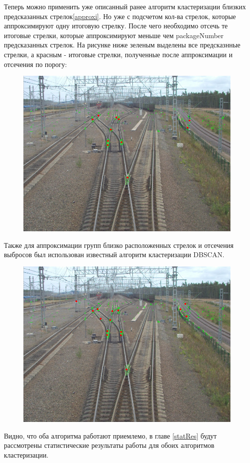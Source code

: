 Теперь можно применить уже описанный ранее алгоритм кластеризации близких предсказанных стрелок\ref{approxi}. Но уже с подсчетом кол-ва стрелок, которые аппроксимируют одну итоговую стрелку. После чего необходимо отсечь те итоговые стрелки, которые аппроксимируют меньше чем packageNumber предсказанных стрелок. На рисунке ниже зеленым выделены все предсказнные стрелки, а красным - итоговые стрелки, полученные после аппроксимации и отсечения по порогу:
\begin{figure}[h!]
	\centering
	\includegraphics[width=0.7\linewidth]{pictures/package1}
	\caption{}
	\label{fig:package1}
\end{figure}
\newpage
Также для аппроксимации групп близко расположенных стрелок и отсечения выбросов был использован известный алгоритм кластеризации DBSCAN\cite{b:dbscan}. 
\begin{figure}[h!]
	\centering
	\includegraphics[width=0.7\linewidth]{pictures/dbscan}
	\caption{}
	\label{fig:package1}
\end{figure}

Видно, что оба алгоритма работают приемлемо, в главе \ref{statRes} будут рассмотрены статистические результаты работы для обоих алгоритмов кластеризации.
\newpage
